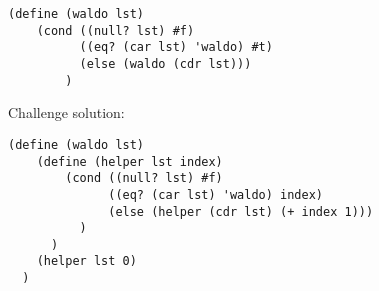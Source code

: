 \documentclass{exam}
\begin{document}
\begin{questions}
\begin{blocksection}
\begin{solution}[0.5in]
\begin{lstlisting}
(define (waldo lst)
    (cond ((null? lst) #f)
          ((eq? (car lst) 'waldo) #t)
          (else (waldo (cdr lst)))
        )
\end{lstlisting}
Challenge solution:
\begin{lstlisting}
(define (waldo lst)
    (define (helper lst index)
        (cond ((null? lst) #f)
              ((eq? (car lst) 'waldo) index)
              (else (helper (cdr lst) (+ index 1)))
          )
      )
    (helper lst 0)
  )
\end{lstlisting}
\end{solution}

\end{blocksection}

\end{questions}

\end{document}
